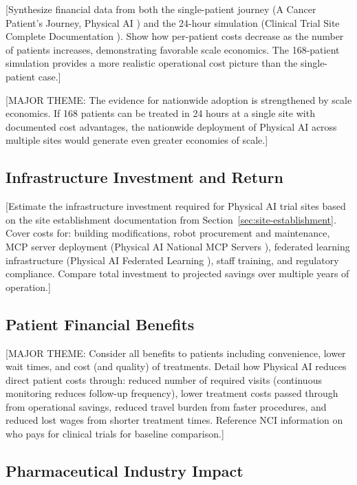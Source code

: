 [Synthesize financial data from both the single-patient journey (A Cancer
Patient's Journey, Physical AI \cite{patient-journey-paper}) and the 24-hour
simulation (Clinical Trial Site Complete Documentation \cite{site-docs}).
Show how per-patient costs decrease as the number of patients increases,
demonstrating favorable scale economics. The 168-patient simulation provides
a more realistic operational cost picture than the single-patient case.]

[MAJOR THEME: The evidence for nationwide adoption is strengthened by
scale economics. If 168 patients can be treated in 24 hours at a single
site with documented cost advantages, the nationwide deployment of Physical AI
across multiple sites would generate even greater economies of scale.]

\subsection{Infrastructure Investment and Return}
\label{subsec:financial-infrastructure}

[Estimate the infrastructure investment required for Physical AI trial sites
based on the site establishment documentation from
Section~\ref{sec:site-establishment}. Cover costs for: building modifications,
robot procurement and maintenance, MCP server deployment (Physical AI National
MCP Servers \cite{national-mcp-paper}), federated learning infrastructure
(Physical AI Federated Learning \cite{fl-paper}), staff training, and
regulatory compliance. Compare total investment to projected savings over
multiple years of operation.]

\subsection{Patient Financial Benefits}
\label{subsec:financial-patient}

[MAJOR THEME: Consider all benefits to patients including convenience, lower
wait times, and cost (and quality) of treatments. Detail how Physical AI
reduces direct patient costs through: reduced number of required visits
(continuous monitoring reduces follow-up frequency), lower treatment costs
passed through from operational savings, reduced travel burden from faster
procedures, and reduced lost wages from shorter treatment times. Reference
NCI information on who pays for clinical trials \cite{nci-trials-paying}
for baseline comparison.]

\subsection{Pharmaceutical Industry Impact}
\label{subsec:financial-pharma}

